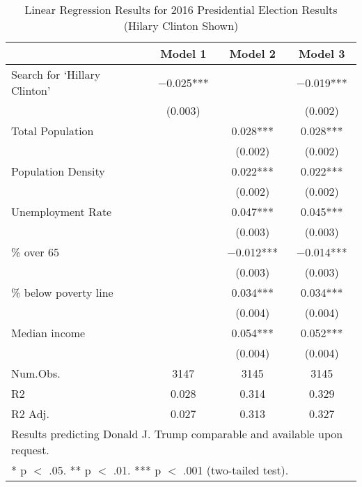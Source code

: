 \begin{table}[!h]

\caption{\label{tab:pres_2016_analysis}Linear Regression Results for 2016 Presidential Election Results (Hilary Clinton Shown)}
\centering
\fontsize{8}{10}\selectfont

\begin{tabular}{lccc}
\toprule
  & Model 1 & Model 2 & Model 3\\
\midrule

Search for `Hillary Clinton' & \num{-0.025}*** &  & \num{-0.019}***\\
 & (\num{0.003}) &  & (\num{0.002})\\
Total Population &  & \num{0.028}*** & \num{0.028}***\\
 &  & (\num{0.002}) & \vphantom{1} (\num{0.002})\\
Population Density &  & \num{0.022}*** & \num{0.022}***\\
 &  & (\num{0.002}) & (\num{0.002})\\
Unemployment Rate &  & \num{0.047}*** & \num{0.045}***\\
 &  & (\num{0.003}) & \vphantom{1} (\num{0.003})\\
\% over 65 &  & \num{-0.012}*** & \num{-0.014}***\\
 &  & (\num{0.003}) & (\num{0.003})\\
\% below poverty line &  & \num{0.034}*** & \num{0.034}***\\
 &  & (\num{0.004}) & \vphantom{1} (\num{0.004})\\
Median income &  & \num{0.054}*** & \num{0.052}***\\
 &  & (\num{0.004}) & (\num{0.004})\\
\midrule
Num.Obs. & \num{3147} & \num{3145} & \num{3145}\\
R2 & \num{0.028} & \num{0.314} & \num{0.329}\\
R2 Adj. & \num{0.027} & \num{0.313} & \num{0.327}\\
\bottomrule
\multicolumn{4}{l}{\rule{0pt}{1em}Results predicting Donald J. Trump comparable and available upon request.}\\
\multicolumn{4}{l}{\rule{0pt}{1em}* p $<$ .05. ** p $<$ .01. *** p $<$ .001 (two-tailed test).}\\
\end{tabular}
\end{table}